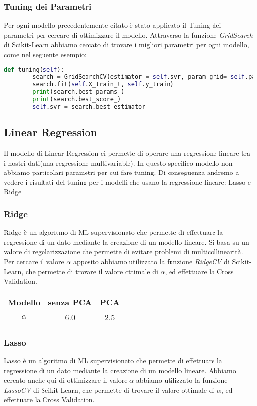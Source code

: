 \documentclass[../../Report.tex]{subfiles}
\begin{document}
\subsubsection{Tuning dei Parametri}
Per ogni modello precedentemente citato è stato applicato il Tuning dei parametri per cercare di ottimizzare il modello.
Attraverso la funzione \textit{GridSearch} di Scikit-Learn abbiamo cercato di trovare i migliori parametri per ogni modello, come nel seguente esempio:
\begin{lstlisting}[language=Python]
    def tuning(self):
        search = GridSearchCV(estimator = self.svr, param_grid= self.params, cv = 3, n_jobs = 6)
        search.fit(self.X_train_t, self.y_train)
        print(search.best_params_)
        print(search.best_score_)
        self.svr = search.best_estimator_
\end{lstlisting}
\subsection{Linear Regression}
Il modello di Linear Regression ci permette di operare una regressione lineare tra i nostri dati(una regressione multivariable).
In questo specifico modello non abbiamo particolari parametri per cui fare tuning.
Di conseguenza andremo a vedere i risultati del tuning per i modelli che usano la regressione lineare: Lasso e Ridge
\subsubsection{Ridge}
Ridge è un algoritmo di ML supervisionato che permette di effettuare la regressione di un dato mediante la creazione di un modello lineare.
Si basa su un valore di regolarizzazione che permette di evitare problemi di multicollinearità.
Per cercare il valore $\alpha$ apposito abbiamo utilizzato la funzione \textit{RidgeCV} di Scikit-Learn, che permette di trovare il valore ottimale di $\alpha$, ed effettuare la Cross Validation.

\begin{table}[h]
    \centering
    \begin{tabular}{|c|c|c|}
    \hline
\textbf{Modello} & \textbf{senza PCA} & \textbf{PCA} \\ \hline
\textbf{$\alpha$} & 6.0 & 2.5\\ \hline
\end{tabular}
\end{table}


\subsubsection{Lasso}
Lasso è un algoritmo di ML supervisionato che permette di effettuare la regressione di un dato mediante la creazione di un modello lineare.
Abbiamo cercato anche qui di ottimizzare il valore $\alpha$ abbiamo utilizzato la funzione \textit{LassoCV} di Scikit-Learn, che permette di trovare il valore ottimale di $\alpha$, ed effettuare la Cross Validation.
\end{document}
